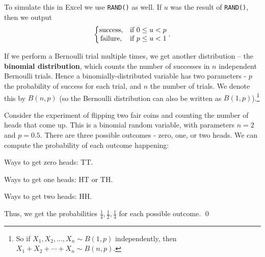 To simulate this in Excel we use \texttt{RAND()} as well.
If $u$ was the result of \texttt{RAND()}, then we output $$\left\{\begin{matrix} \text{success,} & \text{if } 0 \leq u < p \cr \text{failure,} & \text{if } p \leq u < 1 \end{matrix}\right. .$$

If we perform a Bernoulli trial multiple times, we get another distribution -- the \textbf{binomial distribution}, which counts the number of successes in $n$ independent Bernoulli trials.
Hence a binomially-distributed variable has two parameters - $p$ the probability of success for each trial, and $n$ the number of trials.
We denote this by $B(n,p)$ (so the Bernoulli distribution can also be written as $B(1,p)$).\footnote{So if $X_1, X_2, \ldots, X_n \sim B(1,p)$ independently, then $X_1 + X_2 + \cdots + X_n \sim B(n,p)$.}

\begin{myexample}
Consider the experiment of flipping two fair coins and counting the number of heads that come up.
This is a binomial random variable, with parameters $n = 2$ and $p = 0.5$.
There are three possible outcomes - zero, one, or two heads.
We can compute the probability of each outcome happening:

Ways to get zero heads: TT.

Ways to get one heads: HT or TH.

Ways to get two heads: HH.

Thus, we get the probabilities $\frac{1}{4},\frac{1}{2},\frac{1}{4}$ for each possible outcome. \qed
\end{myexample}

